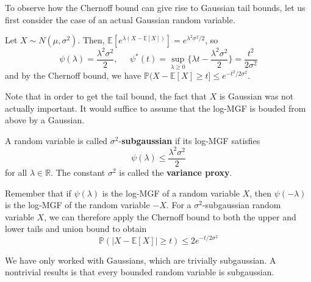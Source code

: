 \documentclass{article}
\begin{document}
  To observe how the Chernoff bound can give rise to Gaussian tail bounds, let us first consider the case of an actual Gaussian random variable. 

  \begin{example}
  Let $X \sim N(\mu, \sigma^2)$. Then, $\mathbb{E}[ e^{\lambda (X - \mathbb{E}[X])} ] = e^{\lambda^2 \sigma^2 / 2}$, so 
  \[\psi(\lambda) = \frac{\lambda^2 \sigma^2}{2}, \;\;\;\;\; \psi^* (t) = \sup_{\lambda \geq 0} \big\{ \lambda t - \frac{\lambda^2 \sigma^2}{2} \big\} = \frac{t^2}{2 \sigma^2}\]
  and by the Chernoff bound, we have $\mathbb{P}(X - \mathbb{E}[X] \geq t ] \leq e^{-t^2 / 2\sigma^2}$. 
  \end{example}

  Note that in order to get the tail bound, the fact that $X$ is Gaussian was not actually important. It would suffice to assume that the log-MGF is bouded from above by a Gaussian. 

  \begin{definition}
  A random variable is called $\sigma^2$-\textbf{subgaussian} if its log-MGF satisfies 
  \[\psi(\lambda) \leq \frac{\lambda^2 \sigma^2}{2}\]
  for all $\lambda \in \mathbb{R}$. The constant $\sigma^2$ is called the \textbf{variance proxy}. 
  \end{definition}

  Remember that if $\psi(\lambda)$ is the log-MGF of a random variable $X$, then $\psi(-\lambda)$ is the log-MGF of the random variable $-X$. For a $\sigma^2$-subgaussian random variable $X$, we can therefore apply the Chernoff bound to both the upper and lower tails and union bound to obtain 
  \[\mathbb{P}(|X - \mathbb{E}[X]| \geq t ) \leq 2 e^{-t/2\sigma^2}\]

  We have only worked with Gaussians, which are trivially subgaussian. A nontrivial results is that every bounded random variable is subgaussian. 
\end{document}
